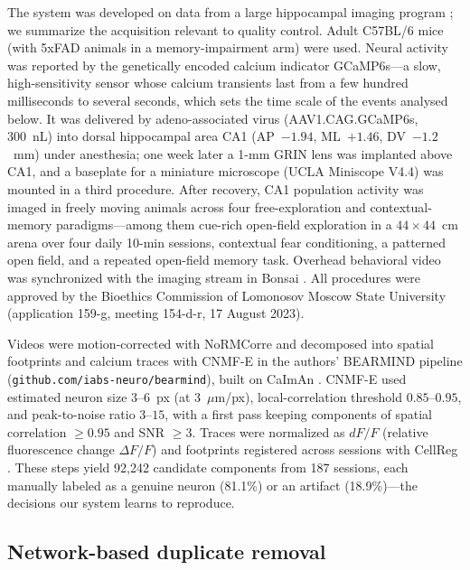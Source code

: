 \documentclass[conference]{IEEEtran}
\begin{document}
The system was developed on data from a large hippocampal imaging program \cite{dataset2026}; we summarize the acquisition relevant to quality control. Adult C57BL/6 mice (with 5xFAD animals in a memory-impairment arm) were used. Neural activity was reported by the genetically encoded calcium indicator GCaMP6s---a slow, high-sensitivity sensor whose calcium transients last from a few hundred milliseconds to several seconds, which sets the time scale of the events analysed below. It was delivered by adeno-associated virus (AAV1.CAG.GCaMP6s, 300~nL) into dorsal hippocampal area CA1 (AP~$-1.94$, ML~$+1.46$, DV~$-1.2$~mm) under anesthesia; one week later a 1-mm GRIN lens was implanted above CA1, and a baseplate for a miniature microscope (UCLA Miniscope V4.4) was mounted in a third procedure. After recovery, CA1 population activity was imaged in freely moving animals across four free-exploration and contextual-memory paradigms---among them cue-rich open-field exploration in a $44\times44$~cm arena over four daily 10-min sessions, contextual fear conditioning, a patterned open field, and a repeated open-field memory task. Overhead behavioral video was synchronized with the imaging stream in Bonsai \cite{lopes2015bonsai}. All procedures were approved by the Bioethics Commission of Lomonosov Moscow State University (application 159-g, meeting 154-d-r, 17 August 2023).

Videos were motion-corrected with NoRMCorre \cite{Pnevmatikakis2017} and decomposed into spatial footprints and calcium traces with CNMF-E \cite{Zhou2018} in the authors' BEARMIND pipeline (\texttt{github.com/iabs-neuro/bearmind}), built on CaImAn \cite{Giovannucci2019}. CNMF-E used estimated neuron size $3$--$6$~px (at 3~$\mu$m/px), local-correlation threshold $0.85$--$0.95$, and peak-to-noise ratio $3$--$15$, with a first pass keeping components of spatial correlation $\ge0.95$ and SNR $\ge3$. Traces were normalized as $dF/F$ (relative fluorescence change $\Delta F/F$) and footprints registered across sessions with CellReg \cite{Sheintuch2017}. These steps yield 92{,}242 candidate components from 187 sessions, each manually labeled as a genuine neuron (81.1\%) or an artifact (18.9\%)---the decisions our system learns to reproduce.

\subsection{Network-based duplicate removal}
\label{sec:network}
\end{document}
